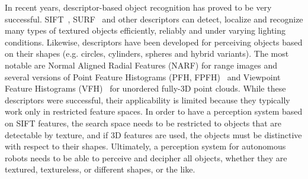 \documentclass[a4paper, 10 pt, conference]{sty/ieeeconf}
\begin{document}
In recent years, descriptor-based object recognition has proved to be very successful.
SIFT~\cite{lowe04distinctive}, SURF~\cite{surf} and other descriptors can
detect, localize and recognize many types of textured objects efficiently, reliably
and under varying lighting conditions. Likewise, descriptors have been developed 
for perceiving objects based on their shapes (e.g. circles, cylinders, spheres and hybrid variants).
The most notable are Normal Aligned Radial Features (NARF)\cite{steder10irosws} for range images 
and several versions of Point Feature  Histograms (PFH, FPFH)~\cite{Rusu09ICRA} and 
Viewpoint Feature Histograms (VFH)~\cite{vfh} for unordered fully-3D point clouds.
While these descriptors were successful, their applicability is limited because they
typically work only in restricted feature spaces. In order to have a perception system
based on SIFT features, the search space needs to be restricted to objects that are detectable by
texture, and if 3D features are used, the objects must be distinctive with respect to their shapes. 
Ultimately, a perception system for autonomous robots
needs to be able to perceive and decipher all objects, whether they are textured, textureless, or different shapes, or the like.
\end{document}
